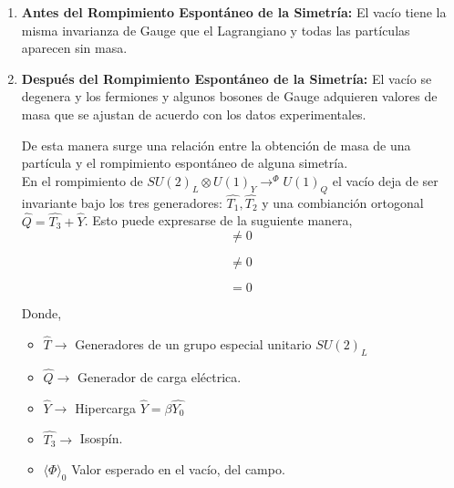 \documentclass[12pt]{article}
\begin{document}
\begin{enumerate}

\item \textbf {Antes del Rompimiento Espontáneo de la Simetría:} El vacío tiene la misma invarianza de Gauge que el Lagrangiano y todas las partículas aparecen sin masa.\\ 

\item \textbf {Después del Rompimiento Espontáneo de la Simetría:} El vacío se degenera y los fermiones y algunos bosones de Gauge adquieren valores de masa que se ajustan de acuerdo con los datos experimentales.

De esta manera surge una relación entre la obtención de masa de una partícula y el rompimiento espontáneo de alguna simetría.\\

En el rompimiento de $SU(2)_L\otimes U(1)_Y  \rightarrow^\Phi U(1)_Q $ el vacío deja de ser invariante bajo los tres generadores: \(\hat{T_1}, \hat{T_2}\) y una combianción ortogonal \(\hat{Q}=\hat{T_3}+ \hat{Y}\). Esto puede expresarse de la suguiente manera,
\begin{equation}
    [{T_{1,2}}^{SU(2)}, \langle \Phi \rangle_0  ] \neq  0 
    \label{eq:2}
\end{equation}

\begin{equation}
    [{T_{3}}^{SU(2)}-\hat{Y}, \langle \Phi \rangle_0  ] \neq  0 
    \label{eq:3}
\end{equation}

\begin{equation}
    [\hat{Q}, \langle \Phi \rangle_0  ] =  0 
    \label{eq:4}
\end{equation}

Donde, 

\begin{itemize}
\item \(\hat{T} \rightarrow \) Generadores de un grupo especial unitario \(SU(2)_L\)
\item \(\hat{Q} \rightarrow \) Generador de carga eléctrica.
\item \(\hat{Y} \rightarrow \) Hipercarga \(\hat{Y} =\beta \hat{Y_0} \)
\item \(\hat{T_3} \rightarrow \) Isospín.
\item \(\langle \Phi \rangle_0  \) Valor esperado en el vacío, del campo.

\end{itemize}


\end{enumerate}
\end{document}
